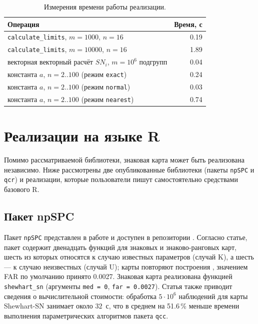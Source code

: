 \documentclass[11pt,a4paper]{article}
\begin{document}
\begin{table}[htbp]\centering
\caption{Измерения времени работы реализации.}
\label{tab:time}
\small
\begin{tabular}{@{}l r@{}}
\toprule
Операция & Время, с \\
\midrule
\texttt{calculate\_limits}, $m=1000$, $n=16$          & 0.19 \\
\texttt{calculate\_limits}, $m=10000$, $n=16$         & 1.89 \\
векторная векторный расчёт $SN_i$, $m=10^6$ подгрупп  & 0.04 \\
константа $a$, $n=2..100$ (режим \texttt{exact})    & 0.24    \\
константа $a$, $n=2..100$ (режим \texttt{normal})     & 0.03 \\
константа $a$, $n=2..100$ (режим \texttt{nearest})    & 0.74 \\
\bottomrule
\end{tabular}
\end{table}

\section{Реализации на языке R}

Помимо рассматриваемой библиотеки, знаковая карта может быть реализована
независимо. Ниже рассмотрены две опубликованные библиотеки (пакеты
\texttt{npSPC} и \texttt{qcr}) и реализации, которые пользователи пишут
самостоятельно средствами базового R.

\subsection{Пакет npSPC}

Пакет \texttt{npSPC} представлен в работе \cite{Nascimento2026} и доступен в
репозитории . Согласно статье, пакет
содержит двенадцать функций для знаковых и знаково-ранговых карт, шесть из
которых относятся к случаю известных параметров (случай K), а шесть --- к
случаю неизвестных (случай U); карты повторяют построения
\cite{Chakraborti2019}, значением FAR по умолчанию принято 0.0027. Знаковая
карта реализована функцией \texttt{shewhart\_sn} (аргументы
\texttt{med = 0}, \texttt{far = 0.0027}). Статья также приводит сведения о
вычислительной стоимости: обработка $5\cdot10^6$ наблюдений для карты
Shewhart-SN занимает около $32$~с, что в среднем на 51.6\,\% меньше времени
выполнения параметрических алгоритмов пакета \texttt{qcc}.
\end{document}
